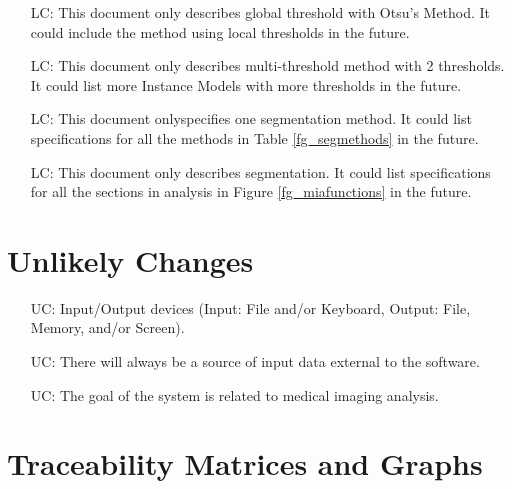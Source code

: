 \documentclass[12pt]{article}
\begin{document}
\noindent \begin{itemize}

\item[LC\refstepcounter{lcnum}\thelcnum\label{LC_localthres}:]This document
only describes global threshold with Otsu's Method. It could include the method
using local thresholds in the future.

\item[LC\refstepcounter{lcnum}\thelcnum\label{LC_morek}:]This document only
describes multi-threshold method with 2 thresholds. It could list more Instance
Models with more thresholds in the future.

\item[LC\refstepcounter{lcnum}\thelcnum\label{LC_allmethods}:]This document
onlyspecifies one segmentation method. It could list specifications for all the
methods in Table \ref{fg_segmethods} in the future.

\item[LC\refstepcounter{lcnum}\thelcnum\label{LC_allanalysis}:]This document
only describes segmentation. It could list specifications for all the sections
in analysis in Figure \ref{fg_miafunctions} in the future.

\end{itemize}

\section{Unlikely Changes}

\noindent
\begin{itemize}

\item[UC\refstepcounter{ucnum}\theucnum\label{uc_IO}:] Input/Output devices
(Input: File and/or Keyboard, Output: File, Memory, and/or Screen).

\item[UC\refstepcounter{ucnum}\theucnum\label{uc_Input}:] 
There will always be a source of input data external to the software.

\item[UC\refstepcounter{ucnum}\theucnum\label{uc_Goal}:] 
The goal of the system is related to medical imaging analysis.

\end{itemize}

\section{Traceability Matrices and Graphs}
\end{document}
